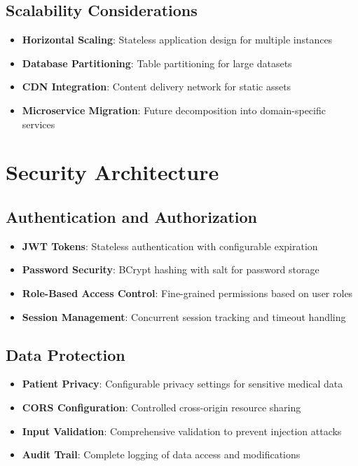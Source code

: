 \documentclass[12pt,a4paper]{article}
\begin{document}
\subsection{Scalability Considerations}
\begin{itemize}
    \item \textbf{Horizontal Scaling}: Stateless application design for multiple instances
    \item \textbf{Database Partitioning}: Table partitioning for large datasets
    \item \textbf{CDN Integration}: Content delivery network for static assets
    \item \textbf{Microservice Migration}: Future decomposition into domain-specific services
\end{itemize}

\section{Security Architecture}

\subsection{Authentication and Authorization}
\begin{itemize}
    \item \textbf{JWT Tokens}: Stateless authentication with configurable expiration
    \item \textbf{Password Security}: BCrypt hashing with salt for password storage
    \item \textbf{Role-Based Access Control}: Fine-grained permissions based on user roles
    \item \textbf{Session Management}: Concurrent session tracking and timeout handling
\end{itemize}

\subsection{Data Protection}
\begin{itemize}
    \item \textbf{Patient Privacy}: Configurable privacy settings for sensitive medical data
    \item \textbf{CORS Configuration}: Controlled cross-origin resource sharing
    \item \textbf{Input Validation}: Comprehensive validation to prevent injection attacks
    \item \textbf{Audit Trail}: Complete logging of data access and modifications
\end{itemize}
\end{document}
